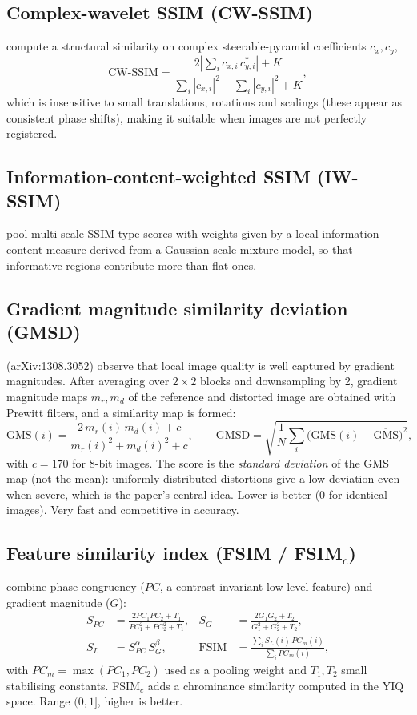 \subsection{Complex-wavelet SSIM (CW-SSIM)}
\citet{sampat2009cwssim} compute a structural similarity on complex steerable-pyramid coefficients $c_x, c_y$,
\[
\text{CW-SSIM}=\frac{2\left|\sum_i c_{x,i}\,c_{y,i}^{*}\right|+K}{\sum_i |c_{x,i}|^2+\sum_i|c_{y,i}|^2+K},
\]
which is insensitive to small translations, rotations and scalings (these appear as consistent phase shifts), making it suitable when images are not perfectly registered.

\subsection{Information-content-weighted SSIM (IW-SSIM)}
\citet{wang2011iwssim} pool multi-scale SSIM-type scores with weights given by a local information-content measure derived from a Gaussian-scale-mixture model, so that informative regions contribute more than flat ones.

\subsection{Gradient magnitude similarity deviation (GMSD)}
\citet{xue2014gmsd} (arXiv:1308.3052) observe that local image quality is well captured by gradient magnitudes. After averaging over $2\times2$ blocks and downsampling by 2, gradient magnitude maps $m_r, m_d$ of the reference and distorted image are obtained with Prewitt filters, and a similarity map is formed:
\[
\mathrm{GMS}(i)=\frac{2\,m_r(i)\,m_d(i)+c}{m_r(i)^2+m_d(i)^2+c},\qquad
\mathrm{GMSD}=\sqrt{\frac1N\sum_i\big(\mathrm{GMS}(i)-\overline{\mathrm{GMS}}\big)^2},
\]
with $c=170$ for 8-bit images. The score is the \emph{standard deviation} of the GMS map (not the mean): uniformly-distributed distortions give a low deviation even when severe, which is the paper's central idea. Lower is better ($0$ for identical images). Very fast and competitive in accuracy.

\subsection{Feature similarity index (\texorpdfstring{FSIM / FSIM$_c$}{FSIM and FSIMc})}
\citet{zhang2011fsim} combine phase congruency ($PC$, a contrast-invariant low-level feature) and gradient magnitude ($G$):
\begin{align*}
S_{PC}&=\frac{2PC_1PC_2+T_1}{PC_1^2+PC_2^2+T_1}, &
S_G&=\frac{2G_1G_2+T_2}{G_1^2+G_2^2+T_2},\\
S_L&=S_{PC}^{\alpha}\,S_G^{\beta}, &
\mathrm{FSIM}&=\frac{\sum_i S_L(i)\,PC_m(i)}{\sum_i PC_m(i)},
\end{align*}
with $PC_m=\max(PC_1,PC_2)$ used as a pooling weight and $T_1,T_2$ small stabilising constants. FSIM$_c$ adds a chrominance similarity computed in the YIQ space. Range $(0,1]$, higher is better.

